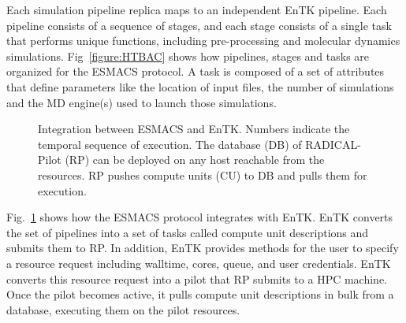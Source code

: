 Each simulation pipeline replica maps to an independent EnTK pipeline. Each
pipeline consists of a sequence of stages, and each stage consists of a single
task that performs unique functions, including pre-processing and molecular
dynamics simulations. Fig~\ref{figure:HTBAC} shows how pipelines, stages and
tasks are organized for the ESMACS protocol. A task is composed of a set of
attributes that define parameters like the location of input files, the number
of simulations and the MD engine(s) used to launch those simulations.


\begin{figure}[h!]
\caption{
  Integration between ESMACS and EnTK\@. Numbers indicate
  the temporal sequence of execution. The database (DB) of RADICAL-Pilot (RP)
  can be deployed on any host reachable from the resources. RP pushes compute
  units (CU) to DB and pulls them for execution.}
  \label{figure:ht-bac_rp}
  \end{figure}




Fig.~\ref{figure:ht-bac_rp} shows how the ESMACS protocol integrates with
EnTK\@. EnTK converts the set of pipelines into a set of tasks called compute
unit descriptions and submits them to RP\@. In addition, EnTK provides
methods for the user to specify a resource request including walltime, cores,
queue, and user credentials. EnTK converts this resource request into a pilot
that RP submits to a HPC machine. Once the pilot becomes active, it pulls
compute unit descriptions in bulk from a database, executing them on the
pilot resources.




